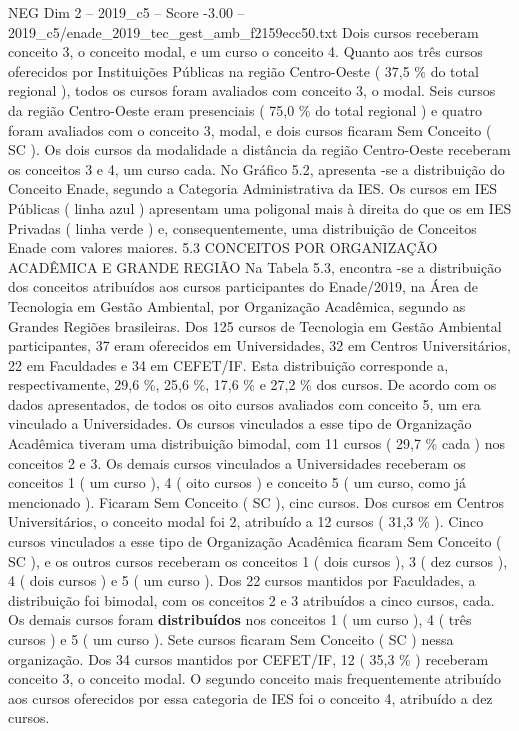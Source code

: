 \begin{textsample}{NEG Dim 2 – 2019\_c5 – Score -3.00 – 2019\_c5/enade\_2019\_tec\_gest\_amb\_f2159ecc50.txt}
Dois cursos receberam conceito 3, o conceito modal, e um curso o conceito 4.
Quanto aos três cursos oferecidos por Instituições Públicas na região Centro-Oeste ( 37,5 \% do total regional ), todos os cursos foram avaliados com conceito 3, o modal.
Seis cursos da região Centro-Oeste eram presenciais ( 75,0 \% do total regional ) e quatro foram avaliados com o conceito 3, modal, e dois cursos ficaram Sem Conceito ( SC ).
Os dois cursos da modalidade a distância da região Centro-Oeste receberam os conceitos 3 e 4, um curso cada.
No Gráfico 5.2, apresenta -se a distribuição do Conceito Enade, segundo a Categoria Administrativa da IES.
Os cursos em IES Públicas ( linha azul ) apresentam uma poligonal mais à direita do que os em IES Privadas ( linha verde ) e, consequentemente, uma distribuição de Conceitos Enade com valores maiores. 5.3 CONCEITOS POR ORGANIZAÇÃO ACADÊMICA E GRANDE REGIÃO Na Tabela 5.3, encontra -se a distribuição dos conceitos atribuídos aos cursos participantes do Enade/2019, na Área de Tecnologia em Gestão Ambiental, por Organização Acadêmica, segundo as Grandes Regiões brasileiras.
Dos 125 cursos de Tecnologia em Gestão Ambiental participantes, 37 eram oferecidos em Universidades, 32 em Centros Universitários, 22 em Faculdades e 34 em CEFET/IF.
Esta distribuição corresponde a, respectivamente, 29,6 \%, 25,6 \%, 17,6 \% e 27,2 \% dos cursos.
De acordo com os dados apresentados, de todos os oito cursos avaliados com conceito 5, um era vinculado a Universidades.
Os cursos vinculados a esse tipo de Organização Acadêmica tiveram uma distribuição bimodal, com 11 cursos ( 29,7 \% cada ) nos conceitos 2 e 3.
Os demais cursos vinculados a Universidades receberam os conceitos 1 ( um curso ), 4 ( oito cursos ) e conceito 5 ( um curso, como já mencionado ).
Ficaram Sem Conceito ( SC ), cinc cursos.
Dos cursos em Centros Universitários, o conceito modal foi 2, atribuído a 12 cursos ( 31,3 \% ).
Cinco cursos vinculados a esse tipo de Organização Acadêmica ficaram Sem Conceito ( SC ), e os outros cursos receberam os conceitos 1 ( dois cursos ), 3 ( dez cursos ), 4 ( dois cursos ) e 5 ( um curso ).
Dos 22 cursos mantidos por Faculdades, a distribuição foi bimodal, com os conceitos 2 e 3 atribuídos a cinco cursos, cada.
Os demais cursos foram \textbf{distribuídos} nos conceitos 1 ( um curso ), 4 ( três cursos ) e 5 ( um curso ).
Sete cursos ficaram Sem Conceito ( SC ) nessa organização.
Dos 34 cursos mantidos por CEFET/IF, 12 ( 35,3 \% ) receberam conceito 3, o conceito modal.
O segundo conceito mais frequentemente atribuído aos cursos oferecidos por essa categoria de IES foi o conceito 4, atribuído a dez cursos.

\end{textsample}
